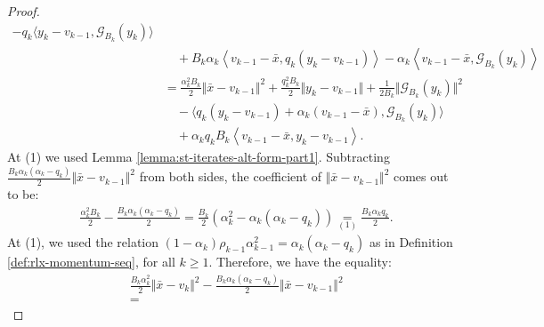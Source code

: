 \documentclass[12pt]{article}
\begin{document}
\begin{proof}
\begin{align*}
                - q_k\langle 
                    y_k - v_{k - 1}, \mathcal G_{B_k}(y_k)
                \rangle
                    \\ &\quad 
                    + 
                    B_k\alpha_k\left\langle 
                        v_{k - 1} - \bar x, 
                        q_k(y_k - v_{k - 1}) 
                    \right\rangle
                    - \alpha_k \left\langle 
                        v_{k - 1} - \bar x,
                        \mathcal G_{B_k}(y_k)
                    \right\rangle
                \\
                &= 
                \frac{\alpha_k^2B_k}{2}
                \Vert \bar x - v_{k - 1}\Vert^2
                + \frac{q_k^2B_k}{2}\Vert y_k - v_{k - 1} \Vert
                + \frac{1}{2B_k}\Vert \mathcal G_{B_k}(y_k)\Vert^2
                    \\ &\quad 
                    - \langle
                        q_k(y_k - v_{k - 1}) + \alpha_k(v_{k - 1} - \bar x), \mathcal G_{B_k}(y_k)
                    \rangle
                    \\ &\quad 
                    + \alpha_k q_k B_k
                    \left\langle 
                        v_{k - 1} - \bar x, 
                        y_k - v_{k - 1}
                    \right\rangle. 
            \end{align*}
            At (1) we used Lemma \ref{lemma:st-iterates-alt-form-part1}. 
            Subtracting $\frac{B_k\alpha_k(\alpha_k - q_k)}{2}\Vert \bar x - v_{k - 1}\Vert^2$ from both sides, the coefficient of $\Vert \bar x - v_{k - 1}\Vert^2$ comes out to be: 
            \begin{align*}
                & \frac{\alpha_k^2B_k}{2}
                - \frac{B_k\alpha_k(\alpha_k - q_k)}{2}
                = \frac{B_k}{2}(
                    \alpha_k^2 - \alpha_k(\alpha_k - q_k)
                )
                \underset{(1)}{=} \frac{B_k\alpha_kq_k}{2}. 
            \end{align*}
            At (1), we used the relation $(1 - \alpha_k)\rho_{k - 1}\alpha_{k - 1}^2 = \alpha_k(\alpha_k - q_k)$ as in Definition \ref{def:rlx-momentum-seq}, for all $k \ge 1$. 
            Therefore, we have the equality: 
            \begin{align*}
                &
                \frac{B_k\alpha_k^2}{2}\Vert \bar x - v_k\Vert^2 
                - \frac{B_k\alpha_k(\alpha_k - q_k)}{2}\Vert \bar x - v_{k - 1}\Vert^2
                \\
                &= 

\end{align*}
\end{proof}
\end{document}
